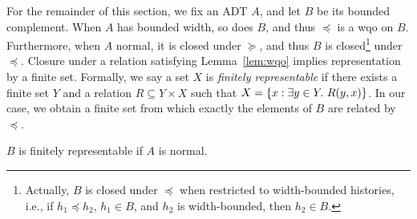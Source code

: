 For the remainder of this section, we fix an ADT $A$, and let $B$ be its bounded
complement. When $A$ has bounded width, so does $B$, and thus $\preceq$ is a wqo
on $B$. Furthermore, when $A$ normal, it is closed under $\succeq$, and thus $B$
is closed\footnote{Actually, $B$ is closed under $\preceq$ when restricted to
width-bounded histories, i.e., if $h_1 \preceq h_2$, $h_1 \in B$, and $h_2$ is
width-bounded, then $h_2\in B$.} under $\preceq$. Closure under a relation
satisfying Lemma~\ref{lem:wqo} implies representation by a finite set. Formally,
we say a set $X$ is \emph{finitely representable} if there exists a finite set
$Y$ and a relation $R \subseteq Y \times X$ such that $X = {\{{ x : \exists
y\in Y.\ R(y,x) }\}}$. In our case, we obtain a finite set from which exactly the
elements of $B$ are related by $\preceq$.

\begin{lemma}

  $B$ is finitely representable if $A$ is normal.

\end{lemma}

